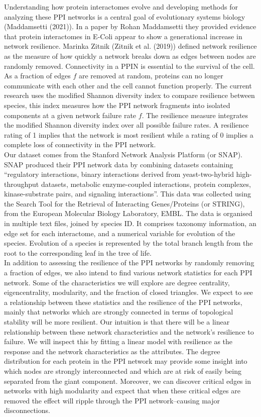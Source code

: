 \documentclass[12pt]{article}
\begin{document}
\indent Understanding how protein interactomes evolve and developing methods for analyzing these PPI networks is a central goal of evolutionary systems biology (Maddamsetti (2021)). In a paper by Rohan Maddamsetti they provided evidence that protein interactomes in E-Coli appear to show a generational increase in network resilience. Marinka Zitnik (Zitnik et al. (2019)) defined network resilience as the measure of how quickly a network breaks down as edges between nodes are randomly removed. Connectivity in a PPIN is essential to the survival of the cell. As a fraction of edges $f$ are removed at random, proteins can no longer communicate with each other and the cell cannot function properly. The current research uses the modified Shannon diversity index to compare resilience between species, this index measures how the PPI network fragments into isolated components at a given network failure rate $f$. The resilience measure integrates the modified Shannon diversity index over all possible failure rates. A resilience rating of 1 implies that the network is most resilient while a rating of 0 implies a complete loss of connectivity in the PPI network. \\
\indent Our dataset comes from the Stanford Network Analysis Platform (or SNAP). SNAP produced their PPI network data by combining datasets containing “regulatory interactions, binary interactions derived from yeast-two-hybrid high-throughput datasets, metabolic enzyme-coupled interactions, protein complexes, kinase-substrate pairs, and signaling interactions”. This data was collected using the Search Tool for the Retrieval of Interacting Genes/Proteins (or STRING), from the European Molecular Biology Laboratory, EMBL. The data is organised in multiple text files, joined by species ID. It comprises taxonomy information, an edge set for each interactome, and a numerical variable for evolution of the species. Evolution of a species is represented by the total branch length from the root to the corresponding leaf in the tree of life. \\
\indent In addition to assessing the resilience of the PPI networks by randomly removing a fraction of edges, we also intend to find various network statistics for each PPI network. Some of the characteristics we will explore are degree centrality, eigencentrality, modularity, and the fraction of closed triangles. We expect to see a relationship between these statistics and the resilience of the PPI networks, mainly that networks which are strongly connected in terms of topological stability will be more resilient. Our intuition is that there will be a linear relationship between these network characteristics and the network's resilience to failure. We will inspect this by fitting a linear model with resilience as the response and the network characteristics as the attributes. The degree distribution for each protein in the PPI network may provide some insight into which nodes are strongly interconnected and which are at risk of easily being separated from the giant component. Moreover, we can discover critical edges in networks with high modularity and expect that when these critical edges are removed the effect will ripple through the PPI network--causing major disconnections. \\
\end{document}
